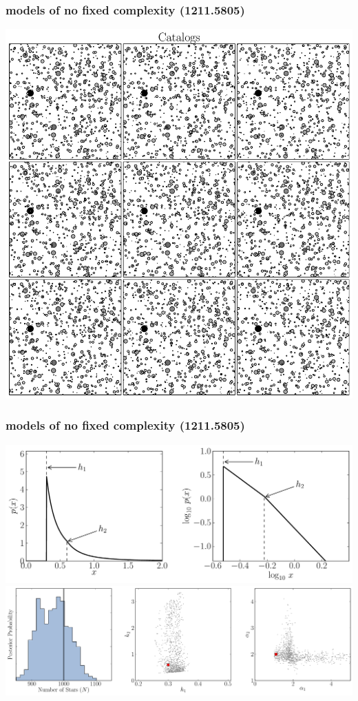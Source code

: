 \documentclass[pdftex]{beamer}
\begin{document}
\begin{frame}
  \frametitle{models of no fixed complexity {\small (1211.5805)}}
  \includegraphics[width=\textwidth]{catalogs_copy.pdf}
\end{frame}

\begin{frame}
  \frametitle{models of no fixed complexity {\small (1211.5805)}}
  \includegraphics[height=0.45\textheight]{broken_copy.pdf}\\
  \includegraphics[height=0.45\textheight]{inference2_copy.pdf}
\end{frame}
\end{document}
